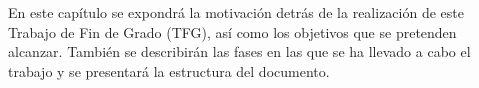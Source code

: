 En este capítulo se expondrá la motivación detrás de la realización de este Trabajo de Fin de Grado (TFG), así como los objetivos que se pretenden alcanzar. También se describirán las fases en las que se ha llevado a cabo el trabajo y se presentará la estructura del documento.